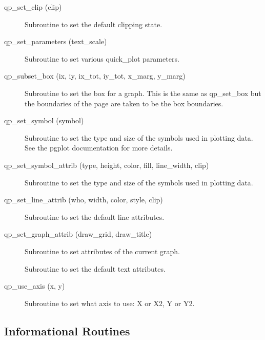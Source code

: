 \begin{description}
\item[qp_set_clip (clip)] \Newline 
     Subroutine to set the default clipping state.

\item[qp_set_parameters (text_scale)] \Newline 
Subroutine to set various quick_plot parameters.

\item[qp_subset_box (ix, iy, ix_tot, iy_tot, x_marg, y_marg)] \Newline 
     Subroutine to set the box for a graph. This is the same as
     qp_set_box but the boundaries of the page are taken to be the box boundaries.

\item[qp_set_symbol (symbol)] \Newline 
     Subroutine to set the type and size of the symbols used in plotting data.
     See the pgplot documentation for more details.

\item[qp_set_symbol_attrib (type, height, color, fill, line_width, clip)] \Newline 
     Subroutine to set the type and size of the symbols used in plotting data.

\item[qp_set_line_attrib (who, width, color, style, clip)] \Newline 
     Subroutine to set the default line attributes.

\item[qp_set_graph_attrib (draw_grid, draw_title)] \Newline 
     Subroutine to set attributes of the current graph.

\item[\protect\parbox{6in}{qp_set_text_attrib (who, height, color, \\
  \hspace*{2in} background, uniform_spacing, spacing_factor)} ] \Newline 
     Subroutine to set the default text attributes.

\item[qp_use_axis (x, y)] \Newline 
Subroutine to set what axis to use: X or X2, Y or Y2.

\end{description}

\subsection{Informational Routines}

